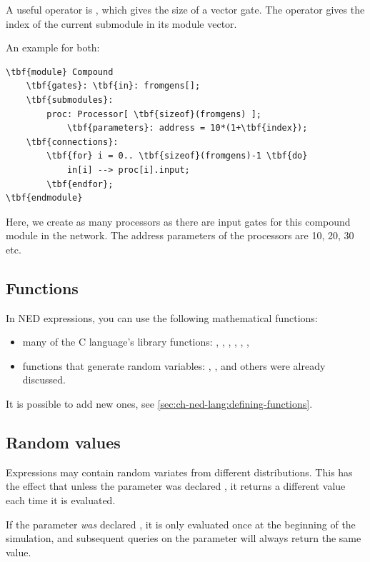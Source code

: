 A useful operator is , which gives the
size of a vector gate. The 
operator gives the index of the current
submodule in its module vector.

An example for both:

\begin{Verbatim}[commandchars=\\\{\}]
\tbf{module} Compound
    \tbf{gates}: \tbf{in}: fromgens[];
    \tbf{submodules}:
        proc: Processor[ \tbf{sizeof}(fromgens) ];
            \tbf{parameters}: address = 10*(1+\tbf{index});
    \tbf{connections}:
        \tbf{for} i = 0.. \tbf{sizeof}(fromgens)-1 \tbf{do}
            in[i] --> proc[i].input;
        \tbf{endfor};
\tbf{endmodule}
\end{Verbatim}


Here, we create as many processors as there are input gates for
this compound module in the network. The address parameters of
the processors are 10, 20, 30 etc.




\subsection{Functions}

In NED expressions, you can use the following mathematical functions:
\begin{itemize}
  \item{many of the C language's  library functions:
    , , , , ,
    , }
  \item{functions that generate random variables: ,
    ,  and others were already
    discussed.}
\end{itemize}

It is possible to add new ones, see \ref{sec:ch-ned-lang:defining-functions}.

\subsection{Random values}

Expressions may contain random variates from different distributions.
This has the effect that unless the parameter was declared ,
it returns a different value each time it is evaluated.

If the parameter \textit{was} declared , it is only evaluated
once at the beginning of the simulation, and subsequent queries
on the parameter will always return the same value.

